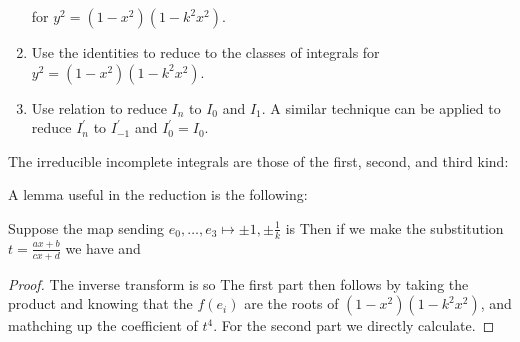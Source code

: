 \documentclass{article}
\begin{document}
\begin{enumerate}
{	}
	for $y^2 = (1-x^2)(1-k^2 x^2)$. 
	\item Use the identities 
	to reduce to the classes of integrals
	for $y^2 = (1-x^2)(1-k^2 x^2)$.
	\item Use relation 
	to reduce $I_n$ to $I_0$ and $I_1$. A similar technique can be applied to reduce $I_n^\prime$ to $I_{-1}^\prime$ and $I_0^\prime=I_0$. 
\end{enumerate}

\begin{idea}
	The irreducible incomplete integrals are those of the first, second, and third kind:
\end{idea}

A lemma useful in the reduction is the following:
\begin{prop}
	Suppose the map sending $e_0, \dots, e_3 \mapsto \pm 1, \pm \frac{1}{k}$ is 
	Then if we make the substitution $t = \frac{ax+b}{cx+d}$ we have 
	and 
\end{prop}
\begin{proof}
	The inverse transform is 
	so 
	The first part then follows by taking the product and knowing that the $f(e_i)$ are the roots of $(1-x^2)(1-k^2x^2)$, and mathching up the coefficient of $t^4$. For the second part we directly calculate. 
\end{proof}
\end{document}
